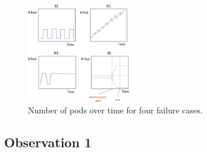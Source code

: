 \begin{figure}[h]
    \centering
    \includegraphics[width=0.4\textwidth]{figure/num_pod.pdf}
    \caption{Number of pods over time for four failure cases.}
    \label{fig:num_pod}
\end{figure}


\subsection*{Observation 1}
